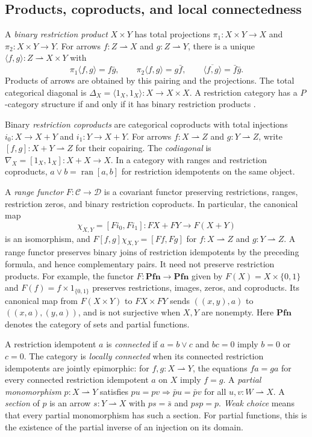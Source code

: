 \documentclass[11pt]{article}
\newcommand{\Pfn}{\mathbf{Pfn}}
\newcommand{\ran}{\operatorname{ran}}
\begin{document}
\subsection{Products, coproducts, and local connectedness}

A \emph{binary restriction product} $X\times Y$ has total
projections $\pi_1:X\times Y\to X$ and $\pi_2:X\times Y\to Y$.
For arrows $f:Z\rightharpoonup X$ and $g:Z\rightharpoonup Y$,
there is a unique $\langle f,g\rangle:Z\rightharpoonup X\times Y$
with
\[
 \pi_1\langle f,g\rangle=f\bar g,\qquad
 \pi_2\langle f,g\rangle=g\bar f,\qquad
 \overline{\langle f,g\rangle}=\bar f\bar g.
\]
Products of arrows are obtained by this pairing and the projections.
The total categorical diagonal is
$\Delta_X=\langle1_X,1_X\rangle:X\to X\times X$.
A restriction category has a $P$-category structure if and only if
it has binary restriction products
\cite[Proposition 4.5]{CockettLackIII}.

Binary \emph{restriction coproducts} are categorical coproducts with
total injections $i_0:X\to X+Y$ and $i_1:Y\to X+Y$.
For arrows $f:X\rightharpoonup Z$ and $g:Y\rightharpoonup Z$,
write $[f,g]:X+Y\rightharpoonup Z$ for their copairing.
The \emph{codiagonal} is
$\nabla_X=[1_X,1_X]:X+X\to X$.
In a category with ranges and restriction coproducts,
$a\vee b=\ran[a,b]$ for restriction idempotents on the same object.

A \emph{range functor} $F:\mathcal C\to\mathcal D$ is a covariant
functor preserving restrictions, ranges, restriction zeros, and binary
restriction coproducts. In particular, the canonical map
\[
 \chi_{X,Y}=[F i_0,F i_1]:FX+FY\longrightarrow F(X+Y)
\]
is an isomorphism, and
$F[f,g]\chi_{X,Y}=[Ff,Fg]$ for $f:X\rightharpoonup Z$ and
$g:Y\rightharpoonup Z$. A range functor preserves binary
joins of restriction idempotents by the preceding formula, and hence
complementary pairs.
It need not preserve restriction products. For example, the functor
$F:\Pfn\to\Pfn$ given by $F(X)=X\times\{0,1\}$ and
$F(f)=f\times1_{\{0,1\}}$ preserves restrictions, images, zeros,
and coproducts. Its canonical map from $F(X\times Y)$ to
$FX\times FY$ sends $((x,y),a)$ to $((x,a),(y,a))$, and is
not surjective when $X,Y$ are nonempty. Here $\Pfn$ denotes the
category of sets and partial functions.

A restriction idempotent $a$ is \emph{connected} if $a=b\vee c$ and $bc=0$
imply $b=0$ or $c=0$. The category is \emph{locally connected}
when its connected restriction idempotents are jointly epimorphic: for
$f,g:X\rightharpoonup Y$, the equations $fa=ga$ for every connected
restriction idempotent $a$ on $X$ imply $f=g$.
A \emph{partial monomorphism} $p:X\rightharpoonup Y$ satisfies
$pu=pv\Rightarrow\bar p u=\bar p v$ for all
$u,v:W\rightharpoonup X$.
A \emph{section} of $p$ is an arrow $s:Y\rightharpoonup X$
with $ps=\bar s$ and $psp=p$.
\emph{Weak choice} means that every partial monomorphism has such
a section. For partial functions, this is the existence of the
partial inverse of an injection on its domain.
\end{document}
